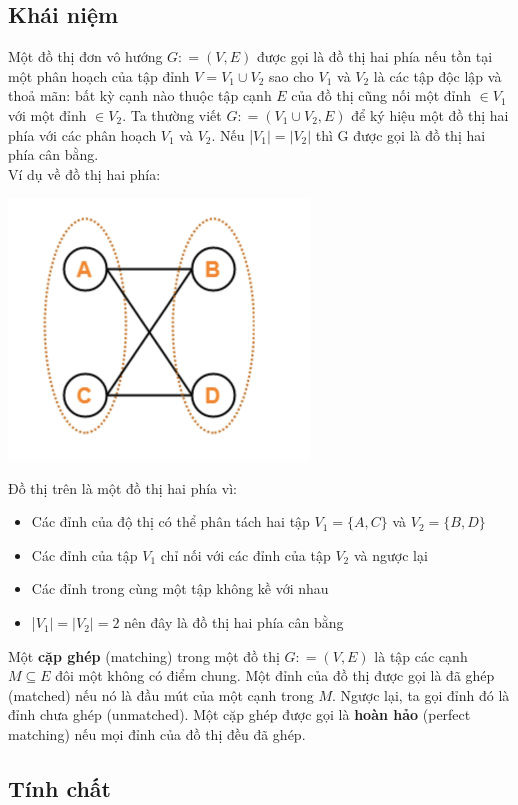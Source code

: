 \documentclass[a4paper, 12pt]{report}
\begin{document}
\subsection{Khái niệm}
Một đồ thị đơn vô hướng $G: = (V,E)$ được gọi là đồ thị hai phía nếu tồn tại một phân hoạch của tập đỉnh $V=V_1 \cup V_2$ sao cho $V_{1}$ và $V_{2}$ là các tập độc lập và thoả mãn: bất kỳ cạnh nào thuộc tập cạnh $E$ của đồ thị cũng nối một đỉnh $\in V_1$ với một đỉnh $\in V_2$.  Ta thường viết $G: = (V_{1} \cup V_{2},E)$ để ký hiệu một đồ thị hai phía với các phân hoạch $V_1$ và $V_2$. Nếu |$ V_{1} | = | V_{2} |$ thì G được gọi là đồ thị hai phía cân bằng. \\
Ví dụ về đồ thị hai phía: 
\begin{center}
	\includegraphics[width=8cm]{ex1}\\
\end{center}
Đồ thị trên là một đồ thị hai phía vì:
\begin{itemize}
	\item Các đỉnh của độ thị có thể phân tách hai tập $V_1=\{A,C\}$ và $V_2=\{B,D\}$ 
	\item Các đỉnh của tập $V_1$ chỉ nối với các đỉnh của tập $V_2$ và ngược lại
	\item Các đỉnh trong cùng một tập không kề với nhau 
	\item |$ V_{1} | = | V_{2} | =2$ nên đây là đồ thị hai phía cân bằng
\end{itemize}

Một \textbf{cặp ghép} (matching) trong một đồ thị $G: = (V,E)$ là tập các cạnh $M \subseteq E$ đôi một không có điểm chung. Một đỉnh của đồ thị được gọi là đã ghép (matched) nếu nó là đầu mút của một cạnh trong $M$. Ngược lại, ta gọi đỉnh đó là đỉnh chưa ghép (unmatched). Một cặp ghép được gọi là \textbf{hoàn hảo} (perfect matching) nếu mọi đỉnh của đồ thị đều đã ghép.
\subsection{Tính chất}
\end{document}
